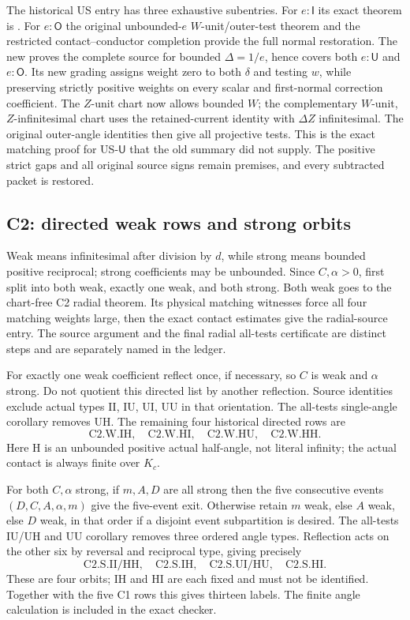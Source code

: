 \documentclass[11pt]{article}
\newcommand{\I}{\mathsf I}
\newcommand{\U}{\mathsf U}
\newcommand{\Otype}{\mathsf O}
\begin{document}
The historical US entry has three exhaustive subentries. For $e:\I$
its exact theorem is . For $e:\Otype$
the original unbounded-$e$ $W$-unit/outer-test theorem and the restricted
contact--conductor completion provide the full normal restoration.
The new  proves the complete
source for bounded $\Delta=1/e$, hence covers both $e:\U$ and
$e:\Otype$. Its new grading assigns weight zero to both $\delta$
and testing $w$, while preserving strictly positive weights on every
scalar and first-normal correction coefficient. The $Z$-unit chart now
allows bounded $W$; the complementary $W$-unit, $Z$-infinitesimal chart
uses the retained-current identity with $\Delta Z$ infinitesimal.
The original outer-angle identities then give all projective tests.
This is the exact matching proof for US-$\U$ that the old summary
did not supply. The positive strict gaps and all original source signs
remain premises, and every subtracted packet is restored.

\subsection{C2: directed weak rows and strong orbits}

Weak means infinitesimal after division by $d$, while strong means
bounded positive reciprocal; strong coefficients may be unbounded.
Since $C,\alpha>0$, first split into both weak, exactly one weak, and
both strong. Both weak goes to the chart-free C2 radial theorem. Its
physical matching witnesses force all four matching weights large,
then the exact contact estimates give the radial-source entry. The
source argument and the final radial all-tests certificate are distinct
steps and are separately named in the ledger.

For exactly one weak coefficient reflect once, if necessary, so $C$
is weak and $\alpha$ strong. Do not quotient this directed list by
another reflection. Source identities exclude actual types II, IU, UI,
UU in that orientation. The all-tests single-angle corollary removes
UH. The remaining four historical directed rows are
\[
\mathrm{C2.W.IH},\quad\mathrm{C2.W.HI},\quad
\mathrm{C2.W.HU},\quad\mathrm{C2.W.HH}.
\]
Here H is an unbounded positive actual half-angle, not literal infinity;
the actual contact is always finite over $K_c$.

For both $C,\alpha$ strong, if $m,A,D$ are all strong then the five
consecutive events $(D,C,A,\alpha,m)$ give the five-event exit.
Otherwise retain $m$ weak, else $A$ weak, else $D$ weak, in that order
if a disjoint event subpartition is desired. The all-tests IU/UH and
UU corollary removes three ordered angle types. Reflection acts on
the other six by reversal and reciprocal type, giving precisely
\[
\mathrm{C2.S.II/HH},\quad\mathrm{C2.S.IH},\quad
\mathrm{C2.S.UI/HU},\quad\mathrm{C2.S.HI}.
\]
These are four orbits; IH and HI are each fixed and must not be
identified. Together with the five C1 rows this gives thirteen labels.
The finite angle calculation is included in the exact checker.
\end{document}
